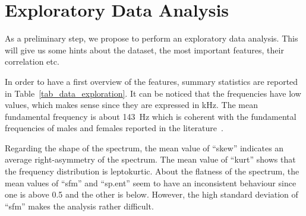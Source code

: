 \chapter{Exploratory Data Analysis}
\label{chapter_data_exploration}

As a preliminary step, we propose to perform an exploratory data analysis. This will give us some hints about the dataset, \eg{} the most important features, their correlation etc.

In order to have a first overview of the features, summary statistics are reported in Table~\ref{tab_data_exploration}. It can be noticed that the frequencies have low values, which makes sense since they are expressed in \si{\kilo\hertz}. 
The mean fundamental frequency is about \SI{143}{\hertz} which is coherent with the fundamental frequencies of males and females reported in the literature~\cite{Traunmller1994}. 

Regarding the shape of the spectrum, the mean value of ``skew'' indicates an average right-asymmetry of the spectrum. The mean value of ``kurt'' shows that the frequency distribution is leptokurtic. About the flatness of the spectrum, the mean values of ``sfm'' and ``sp.ent'' seem to have an inconsistent behaviour since one is above \num{0.5} and the other is below. However, the high standard deviation of ``sfm'' makes the analysis rather difficult.

